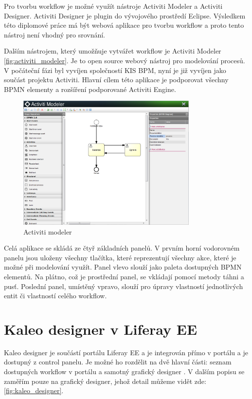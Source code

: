 \documentclass{fithesis}
\begin{document}
Pro tvorbu workflow je možné využít nástroje Activiti Modeler a Activiti Designer. Activiti Designer je plugin do vývojového prostředí Eclipse. Výsledkem této diplomové práce má být webová aplikace pro tvorbu workflow a proto tento nástroj není vhodný pro srovnání. 

Dalším nástrojem, který umožňuje vytvářet workflow je  Activiti Modeler \autoref{fig:activiti_modeler}. Je to open source webový nástroj pro modelování procesů. V počáteční fázi byl vyvíjen společností KIS BPM, nyní je již vyvíjen jako součást projektu Activiti. Hlavní cílem této aplikace je podporovat všechny BPMN elementy a rozšíření podporované Activiti Engine. 

\begin{figure}[htp]
\centering
\includegraphics[width=340px]{images/activiti_modeler.png}
\caption{Activiti modeler}
\label{fig:activiti_modeler}
\end{figure}

Celá aplikace se skládá ze čtyř základních panelů. V prvním horní vodorovném panelu jsou uloženy všechny tlačítka, které reprezentují všechny akce, které je možné při modelování využít. Panel vlevo slouží jako paleta dostupných BPMN elementů. Na plátno, což je prostřední panel, se vkládají pomocí metody táhni a pusť. Poslední panel, umístěný vpravo, slouží pro úpravy vlastností jednotlivých entit či vlastností celého workflow.

\section{Kaleo designer v Liferay EE}
Kaleo designer je součástí portálu Liferay EE a je integrován přímo v portálu a je dostupný z control panelu. Je možné ho rozdělit na dvě hlavní části: seznam dostupných workflow v portálu a samotný grafický designer . V dalším popisu se zaměřím pouze na grafický designer, jehož detail můžeme vidět zde: \autoref{fig:kaleo_designer}.
\end{document}
